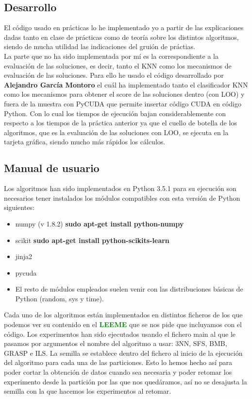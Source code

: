 \documentclass[10pt,a4paper]{article}
\begin{document}
\subsection{\color[rgb]{0.0,0.0,0.51}Desarrollo}

El código usado en prácticas lo he implementado yo a partir de las explicaciones dadas tanto en clase de prácticas como de teoría sobre los distintos algoritmos, siendo de mucha utilidad las indicaciones del gruión de práctias.\\

La parte que no ha sido implementada por mí es la correspondiente a la evaluación de las soluciones, es decir, tanto el KNN como los mecanismos de evaluación de las soluciones. Para ello he usado el código desarrollado por \textbf{Alejandro García Montoro} el cuál ha implementado tanto el clasificador KNN como los mecanismos para obtener el score de las soluciones dentro (con LOO) y fuera de la muestra con PyCUDA que permite insertar código CUDA en código Python. Con lo cual los tiempos de ejecución bajan considerablemente con respecto a los tiempos de la práctica anterior ya que el cuello de botella de los algoritmos, que es la evaluación de las soluciones con LOO, se ejecuta en la tarjeta gráfica, siendo mucho más rápidos los cálculos.\\

\subsection{\color[rgb]{0.0,0.0,0.51}Manual de usuario}
Los algoritmos han sido implementados en Python 3.5.1 para su ejecución son necesarios tener instalados los módulos compatibles con esta versión de Python siguientes:\\

\begin{itemize}
\item numpy (v 1.8.2) \textbf{sudo apt-get install python-numpy}
\item scikit \textbf{sudo apt-get install python-scikits-learn}
\item jinja2
\item pycuda
\item El resto de módulos empleados suelen venir con las distribuciones básicas de Python (random, sys y time).
\end{itemize}

Cada uno de los algoritmos están implementados en distintos ficheros de los que podemos ver su contenido en el \textbf{\textcolor{green}{LEEME}} que se nos pide que incluyamos con el código. Los experimentos han sido ejecutados usando el fichero main al que le pasamos por argumentos el nombre del algoritmo a usar: 3NN, SFS, BMB, GRASP e ILS. La semilla se establece dentro del fichero al inicio de la ejecución del algoritmo para cada una de las particiones. Esto lo hemos hecho así para poder cortar la obtención de datos cuando sea necesaria y poder retomar los experimento desde la partición por las que nos quedáramos, así no se desajusta la semilla con la que hacemos los experimentos al retomar.\\
\end{document}
